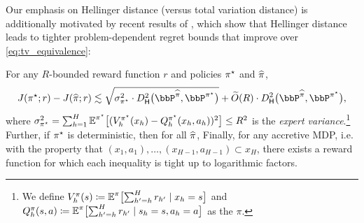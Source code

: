 %

Our emphasis on Hellinger distance
(versus total variation distance) is additionally motivated by recent results
of \citet{foster2024behavior}, which show that Hellinger distance
leads to tighter problem-dependent regret bounds that improve over \cref{eq:tv_equivalence}:\loose
\begin{proposition}\label{prop:hellinger-to-il}
For any $R$-bounded reward function $r$ and policies
  $\pistar$ and $\pihat$,
  \begin{align}
    \label{eq:bc_stochastic}
    J(\pistar;r)-J(\pihat;r)
    \approxleq{} \sqrt{\sigmastar^2\cdot\DhelsX{\big}{\bbP^{\pihat}}{\bbP^{\pistar}}}
    + \bigoht\prn*{R}\cdot\DhelsX{\big}{\bbP^{\pihat}}{\bbP^{\pistar}},
  \end{align}
  where
  $\sigmastar^2=\sum_{h=1}^{H}\En^{\pistar}\brk*{(\Vstar_h(x_h)-\Qstar_h(x_h,a_h))^2}\leq{}R^2$
  is the \emph{expert variance}.\footnote{We
    define $V_h^{\pi}(s)\coloneqq\En^{\pi}\brk[\big]{\sum_{h'=h}^{H}r_{h'}\mid{}x_h=s}$ and
    $Q_h^{\pi}(s,a)\coloneqq\En^{\pi}\brk[\big]{\sum_{h'=h}^{H}r_{h'}\mid{}s_h=s,
      a_h=a}$ as the $\pi$.}
  Further, if $\pistar$ is deterministic, then
  for all $\pihat$, %
  Finally, for any accretive MDP, i.e. with the property that
  $(x_1,a_1),\ldots,(x_{H-1},a_{H-1})\subset x_H$, there exists a
  reward function for which each inequality is tight up to logarithmic factors.
\end{proposition}


